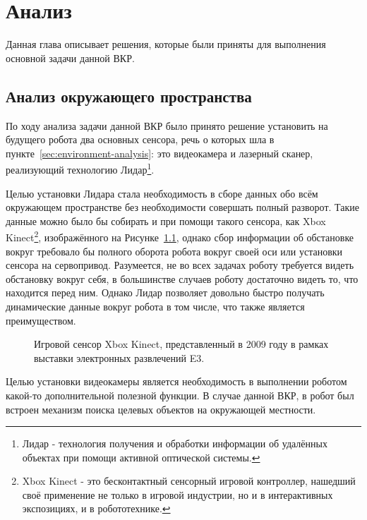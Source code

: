 \chapter{Анализ}\label{ch:ch2}

Данная глава описывает решения, которые были приняты для выполнения основной задачи данной ВКР.

\section{Анализ окружающего пространства}

По ходу анализа задачи данной ВКР было принято решение установить на будущего робота два основных сенсора, речь о которых шла в пункте~\ref{sec:environment-analysis}: это видеокамера и лазерный сканер, реализующий технологию Лидар\footnote{Лидар - технология получения и обработки информации об удалённых объектах при помощи активной оптической системы\cite[с. 20]{mather2005computer}.}.

Целью установки Лидара стала необходимость в сборе данных обо всём окружающем пространстве без необходимости совершать полный разворот. Такие данные можно было бы собирать и при помощи такого сенсора, как Xbox Kinect\footnote{Xbox Kinect - это бесконтактный сенсорный игровой контроллер, нашедший своё применение не только в игровой индустрии, но и в интерактивных экспозициях, и в робототехнике\cite{kinect-habr}.}, изображённого на Рисунке~\ref{fig:KinectSensor}, однако сбор информации об обстановке вокруг требовало бы полного оборота робота вокруг своей оси или установки сенсора на сервопривод. Разумеется, не во всех задачах роботу требуется видеть обстановку вокруг себя, в большинстве случаев роботу достаточно видеть то, что находится перед ним. Однако Лидар позволяет довольно быстро получать динамические данные вокруг робота в том числе, что также является преимуществом.
\begin{figure}[ht]
  \caption{Игровой сенсор Xbox Kinect, представленный в 2009 году в рамках выставки электронных развлечений E3.}\label{fig:KinectSensor}
\end{figure}

Целью установки видеокамеры является необходимость в выполнении роботом какой-то дополнительной полезной функции. В случае данной ВКР, в робот был встроен механизм поиска целевых объектов на окружающей местности.  

